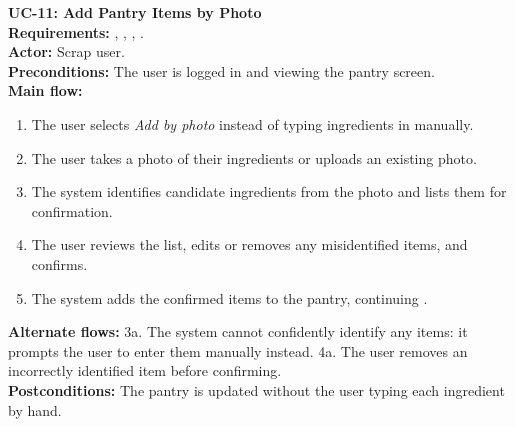 \begin{sloppypar}
\medskip\noindent\textbf{UC-11: Add Pantry Items by Photo}\\
\textbf{Requirements:} , , , .\\
\textbf{Actor:} Scrap user.\\
\textbf{Preconditions:} The user is logged in and viewing the pantry screen.\\
\textbf{Main flow:}
\begin{enumerate}
\item The user selects \textit{Add by photo} instead of typing ingredients in manually.
\item The user takes a photo of their ingredients or uploads an existing photo.
\item The system identifies candidate ingredients from the photo and lists them for confirmation.
\item The user reviews the list, edits or removes any misidentified items, and confirms.
\item The system adds the confirmed items to the pantry, continuing .
\end{enumerate}
\textbf{Alternate flows:} 3a. The system cannot confidently identify any items: it prompts the user to enter them manually instead. \quad 4a. The user removes an incorrectly identified item before confirming.\\
\textbf{Postconditions:} The pantry is updated without the user typing each ingredient by hand.


\end{sloppypar}
